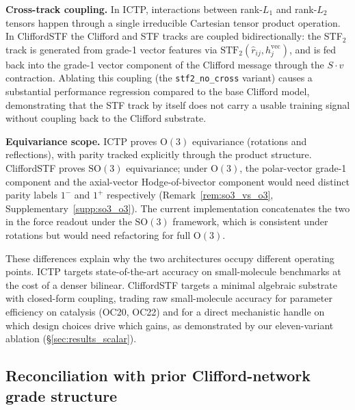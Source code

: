 \textbf{Cross-track coupling.} In ICTP, interactions between rank-$L_1$ and rank-$L_2$ tensors happen through a single irreducible Cartesian tensor product operation. In CliffordSTF the Clifford and STF tracks are coupled bidirectionally: the STF$_2$ track is generated from grade-1 vector features via $\mathrm{STF}_2(\hat{r}_{ij}, h_j^{\mathrm{vec}})$, and is fed back into the grade-1 vector component of the Clifford message through the $S \cdot v$ contraction. Ablating this coupling (the \texttt{stf2\_no\_cross} variant) causes a substantial performance regression compared to the base Clifford model, demonstrating that the STF track by itself does not carry a usable training signal without coupling back to the Clifford substrate.

\textbf{Equivariance scope.} ICTP proves $\mathrm{O}(3)$ equivariance (rotations and reflections), with parity tracked explicitly through the product structure. CliffordSTF proves $\mathrm{SO}(3)$ equivariance; under $\mathrm{O}(3)$, the polar-vector grade-1 component and the axial-vector Hodge-of-bivector component would need distinct parity labels $1^-$ and $1^+$ respectively (Remark~\ref{rem:so3_vs_o3}, Supplementary~\ref{supp:so3_o3}). The current implementation concatenates the two in the force readout under the $\mathrm{SO}(3)$ framework, which is consistent under rotations but would need refactoring for full $\mathrm{O}(3)$.

These differences explain why the two architectures occupy different operating points. ICTP targets state-of-the-art accuracy on small-molecule benchmarks at the cost of a denser bilinear. CliffordSTF targets a minimal algebraic substrate with closed-form coupling, trading raw small-molecule accuracy for parameter efficiency on catalysis (OC20, OC22) and for a direct mechanistic handle on which design choices drive which gains, as demonstrated by our eleven-variant ablation (\S\ref{sec:results_scalar}).

\subsection{Reconciliation with prior Clifford-network grade structure}\label{supp:gatr}

